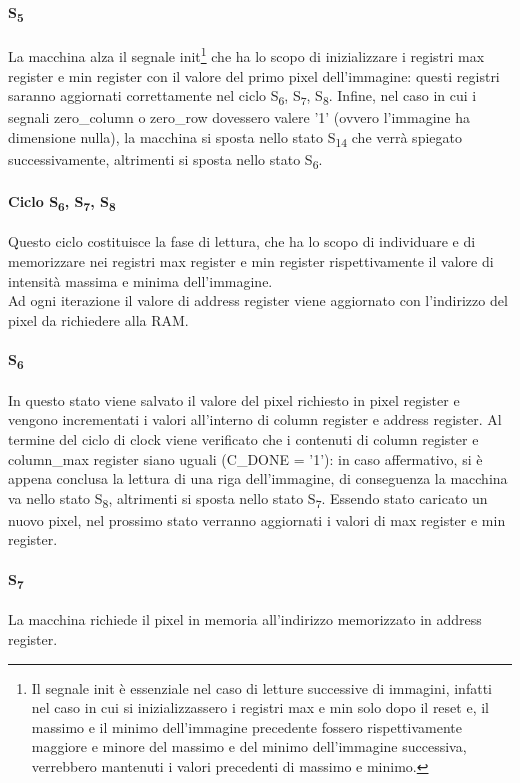 \paragraph{S\textsubscript{5}}
La macchina alza il segnale init\footnote{Il segnale init è essenziale nel caso di letture successive di immagini, infatti nel caso in cui si inizializzassero i registri max e min solo dopo il reset e, il massimo e il minimo dell'immagine precedente fossero rispettivamente maggiore e minore del massimo e del minimo dell'immagine successiva, verrebbero mantenuti i valori precedenti di massimo e minimo.} che ha lo scopo di inizializzare i registri max register e min register con il valore del primo pixel dell'immagine: questi registri saranno aggiornati correttamente nel ciclo S\textsubscript{6}, S\textsubscript{7}, S\textsubscript{8}.
Infine, nel caso in cui i segnali zero\_column o zero\_row dovessero valere '1' (ovvero l'immagine ha dimensione nulla), la macchina si sposta nello stato S\textsubscript{14} che verrà spiegato successivamente, altrimenti si sposta nello stato S\textsubscript{6}.
\paragraph{Ciclo S\textsubscript{6}, S\textsubscript{7}, S\textsubscript{8}}
Questo ciclo costituisce la fase di lettura, che ha lo scopo di individuare e di memorizzare nei registri max register e min register rispettivamente il valore di intensità massima e minima dell'immagine.\\
Ad ogni iterazione il valore di address register viene aggiornato con l'indirizzo del pixel da richiedere alla RAM.
\paragraph{S\textsubscript{6}}
In questo stato viene salvato il valore del pixel richiesto in pixel register e vengono incrementati i valori all'interno di column register e address register. Al termine del ciclo di clock viene verificato che i contenuti di column register e column\_max register siano uguali (C\_DONE = '1'): in caso affermativo, si è appena conclusa la lettura di una riga dell'immagine, di conseguenza la macchina va nello stato S\textsubscript{8}, altrimenti si sposta nello stato S\textsubscript{7}.
Essendo stato caricato un nuovo pixel, nel prossimo stato verranno aggiornati i valori di max register e min register.
\paragraph{S\textsubscript{7}}
La macchina richiede il pixel in memoria all'indirizzo memorizzato in address register.
